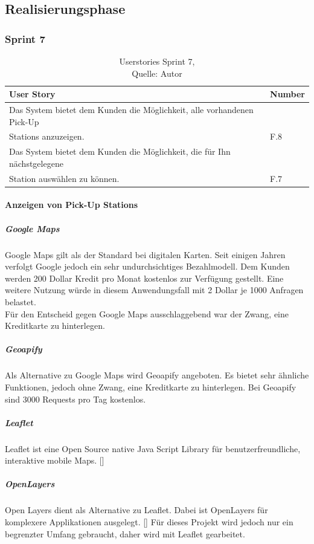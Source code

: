 \subsection{Realisierungsphase}
\subsubsection{Sprint 7}
\begin{table}[H]
	\begin{tabularx}{\textwidth}{|l|X|}
		\hline
		\textbf{User Story} & \textbf{Number} \\
		\hline
		Das System bietet dem Kunden die Möglichkeit, alle vorhandenen Pick-Up \\Stations anzuzeigen. & F.8\\
		\hline
		Das System bietet dem Kunden die Möglichkeit, die für Ihn nächstgelegene\\ Station auswählen zu können. & F.7\\
		\hline
	\end{tabularx} 
	\caption[Userstories Sprint 7]{Userstories Sprint 7,\\ Quelle: Autor}
\end{table}\label{userStoriesSprint7}
\paragraph{Anzeigen von Pick-Up Stations}
\subparagraph{Google Maps}
Google Maps gilt als der Standard bei digitalen Karten. Seit einigen Jahren verfolgt Google jedoch ein sehr undurchsichtiges Bezahlmodell. Dem Kunden werden 200 Dollar Kredit pro Monat kostenlos zur Verfügung gestellt. Eine weitere Nutzung würde in diesem Anwendungsfall mit 2 Dollar je 1000 Anfragen belastet. \\
Für den Entscheid gegen Google Maps ausschlaggebend war der Zwang, eine Kreditkarte zu hinterlegen. 
\subparagraph{Geoapify}
Als Alternative zu Google Maps wird Geoapify angeboten. Es bietet sehr ähnliche Funktionen, jedoch ohne Zwang, eine Kreditkarte zu hinterlegen. Bei Geoapify sind 3000 Requests pro Tag kostenlos. 
\subparagraph{Leaflet}
Leaflet ist eine Open Source native Java Script Library für benutzerfreundliche, interaktive mobile Maps. [\cite{leaflet}]
\subparagraph{OpenLayers}
Open Layers dient als Alternative zu Leaflet. Dabei ist OpenLayers für komplexere Applikationen ausgelegt. [\cite{leafletVsOpenlayers}]
Für dieses Projekt wird jedoch nur ein begrenzter Umfang gebraucht, daher wird mit Leaflet gearbeitet. 

